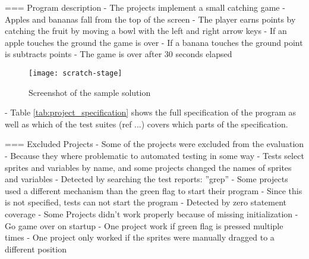 === Program description
- The projects implement a small catching game
- Apples and bananas fall from the top of the screen
- The player earns points by catching the fruit by moving a bowl with the left and right arrow keys
- If an apple touches the ground the game is over
- If a banana touches the ground point is subtracts points
- The game is over after 30 seconds elapsed

\begin{figure}[ht]
    \centering
    \texttt{[image: scratch-stage]}
    \caption{Screenshot of the sample solution}
    \label{fig:screenshot_of_the_sample_solution}
\end{figure}

- Table \ref{tab:project_specification} shows the full specification of the program as well as which of the test suites (ref ...) covers which parts of the specification.

=== Excluded Projects
- Some of the projects were excluded from the evaluation
- Because they where problematic to automated testing in some way
    - Tests select sprites and variables by name, and some projects changed the names of sprites and variables
        - Detected by searching the test reports: ''grep''
    - Some projects used a different mechanism than the green flag to start their program
        - Since this is not specified, tests can not start the program
        - Detected by zero statement coverage
    - Some Projects didn't work properly because of missing initialization
        - Go game over on startup
        - One project work if green flag is pressed multiple times
        - One project only worked if the sprites were manually dragged to a different position

